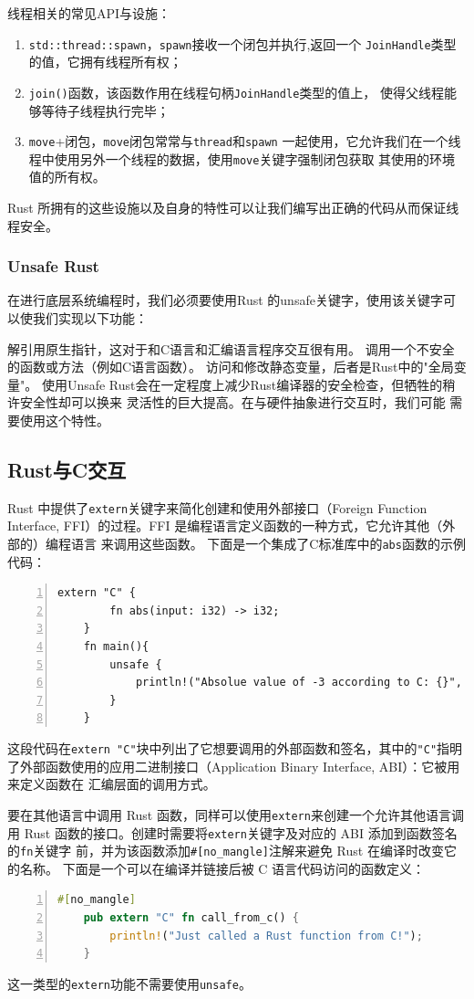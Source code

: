 \documentclass{../runikraft-report}
\begin{document}
\noindent 线程相关的常见API与设施：

\begin{enumerate}
\item \texttt{std::thread::spawn}，\texttt{spawn}接收一个闭包并执行,返回一个
\texttt{JoinHandle}类型的值，它拥有线程所有权；
\item  \texttt{join()}函数，该函数作用在线程句柄\texttt{JoinHandle}类型的值上，
使得父线程能够等待子线程执行完毕；
\item \texttt{move}+闭包，\texttt{move}闭包常常与\texttt{thread}和\texttt{spawn}
一起使用，它允许我们在一个线程中使用另外一个线程的数据，使用\texttt{move}关键字强制闭包获取
其使用的环境值的所有权。
\end{enumerate}

Rust 所拥有的这些设施以及自身的特性可以让我们编写出正确的代码从而保证线程安全。\cite{bib:feasibility-9}

\subsubsection{Unsafe Rust}
在进行底层系统编程时，我们必须要使用Rust 的unsafe关键字，使用该关键字可以使我们实现以下功能：

解引用原生指针，这对于和C语言和汇编语言程序交互很有用。
调用一个不安全的函数或方法（例如C语言函数）。
访问和修改静态变量，后者是Rust中的"全局变量"。
使用Unsafe Rust会在一定程度上减少Rust编译器的安全检查，但牺牲的稍许安全性却可以换来
灵活性的巨大提高。在与硬件抽象进行交互时，我们可能
需要使用这个特性。

\subsection{Rust与C交互}
Rust 中提供了\texttt{extern}关键字来简化创建和使用外部接口（Foreign Function
Interface, FFI）的过程。FFI 是编程语言定义函数的一种方式，它允许其他（外部的）编程语言
来调用这些函数。
下面是一个集成了C标准库中的\texttt{abs}函数的示例代码：
\begin{lstlisting}[numbers=left]
	extern "C" {
		fn abs(input: i32) -> i32;
	}
	fn main(){
		unsafe {
			println!("Absolue value of -3 according to C: {}", abs(-3));
		}
	}
\end{lstlisting}
这段代码在\texttt{extern "C"}块中列出了它想要调用的外部函数和签名，其中的\texttt{"C"}指明
了外部函数使用的应用二进制接口（Application Binary Interface, ABI）：它被用来定义函数在
汇编层面的调用方式。

要在其他语言中调用 Rust 函数，同样可以使用\texttt{extern}来创建一个允许其他语言调用 Rust
函数的接口。创建时需要将\texttt{extern}关键字及对应的 ABI 添加到函数签名的\texttt{fn}关键字
前，并为该函数添加\texttt{\#[no\_mangle]}注解来避免 Rust 在编译时改变它的名称。
下面是一个可以在编译并链接后被 C 语言代码访问的函数定义：
\begin{lstlisting}[numbers=left,language=Rust]
	#[no_mangle]
	pub extern "C" fn call_from_c() {
		println!("Just called a Rust function from C!");
	}
\end{lstlisting}
这一类型的\texttt{extern}功能不需要使用\texttt{unsafe}。
\end{document}
